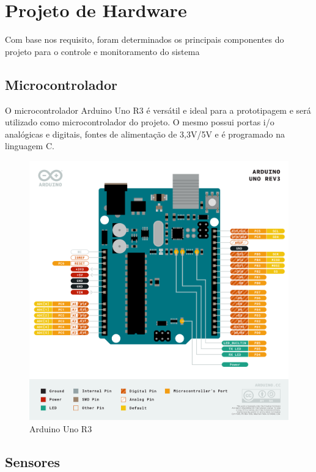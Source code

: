 \section{Projeto de Hardware}

Com base nos requisito, foram determinados os principais componentes do projeto
para o controle e monitoramento do sistema

\subsection{Microcontrolador}

O microcontrolador Arduino Uno R3 é versátil e ideal para a prototipagem e será
utilizado como microcontrolador do projeto. O mesmo possui portas i/o analógicas e
digitais, fontes de alimentação de 3,3V/5V e é programado na linguagem C.

\begin{figure}[h]
    \centering
    \includegraphics[scale=0.35]{figuras/projeto/hardware/arduino.png}
    \caption{Arduino Uno R3}
    \label{fig:arduino}
\end{figure}

\subsection{Sensores}

